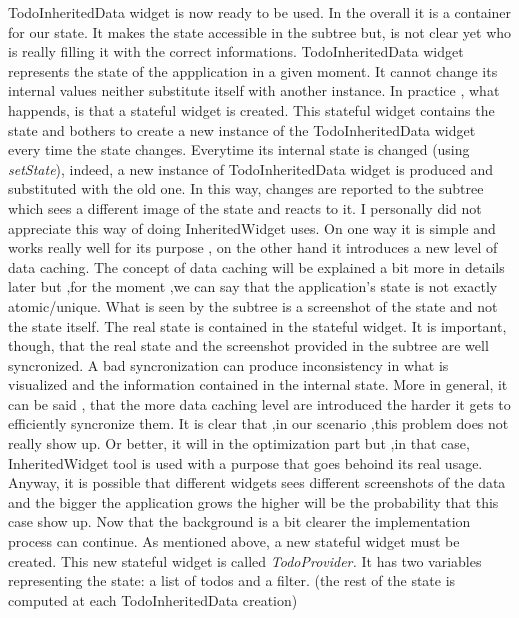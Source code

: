 \mbox{}
TodoInheritedData widget is now ready to be used. In the overall it is a container for our state. It makes the state accessible in the subtree but, is not clear yet who is really filling it with the correct informations. TodoInheritedData widget represents the state of the appplication in a given moment. It cannot change its internal values neither substitute itself with another instance. In practice , what happends, is that a stateful widget is created. This stateful widget contains the state and bothers to create a new instance of the TodoInheritedData widget every time the state changes. Everytime its internal state is changed (using \textit{setState}), indeed, a new instance of TodoInheritedData widget is produced and substituted with the old one. In this way, changes are reported to the subtree which sees a different image of the state and reacts to it. I personally did not appreciate this way of doing InheritedWidget uses. On one way it is simple and works really well for its purpose , on the other hand it introduces a new level of data caching. The concept of data caching will be explained a bit more in details later but ,for the moment ,we can say that the application's state is not exactly atomic/unique. What is seen by the subtree is a screenshot of the state and not the state itself. The real state is contained in the stateful widget. It is important, though, that the real state and the screenshot provided in the subtree are well syncronized. A bad syncronization can produce inconsistency in what is visualized and the information contained in the internal state. More in general, it can be said , that the more data caching level are introduced the harder it gets to efficiently syncronize them. It is clear that ,in our scenario ,this problem does not really show up. Or better, it will in the optimization part but ,in that case, InheritedWidget tool is used with a purpose that goes behoind its real usage. Anyway, it is possible that different widgets sees different screenshots of the data and the bigger the application grows the higher will be the probability that this case show up. Now that the background is a bit clearer the implementation process can continue. As mentioned above, a new stateful widget must be created. This new stateful widget is called \textit{TodoProvider.} It has two variables representing the state: a list of todos and a filter. (the rest of the state is computed at each TodoInheritedData creation)
\mbox{}\\

